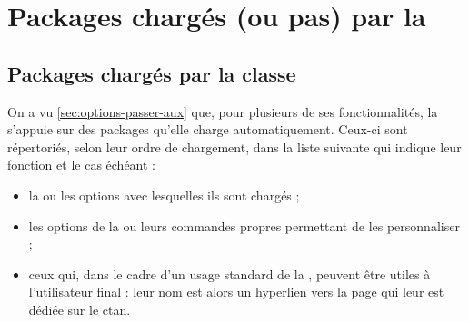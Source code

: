 \chapter{Packages chargés (ou pas) par la \yatcl}\label{cha:packages-charges}

\section{Packages chargés par la classe}\label{sec:packages-charges-par}

On a vu \vref{sec:options-passer-aux} que, pour plusieurs de ses
fonctionnalités, la \yatcl s'appuie sur des packages qu'elle charge
automatiquement. Ceux-ci sont répertoriés, selon leur ordre de chargement, dans
la liste suivante qui indique leur fonction et le cas échéant :
\begin{itemize}
\item la ou les options avec lesquelles ils sont chargés ;
\item les options de la \yatcl{} ou leurs commandes propres permettant de les
  personnaliser ;
\item ceux qui, dans le cadre d'un usage standard de la \yatcl{}, peuvent être
  utiles à l'utilisateur final : leur nom est alors un hyperlien vers la page
  qui leur est dédiée sur le \acrshort{ctan}.
\end{itemize}

